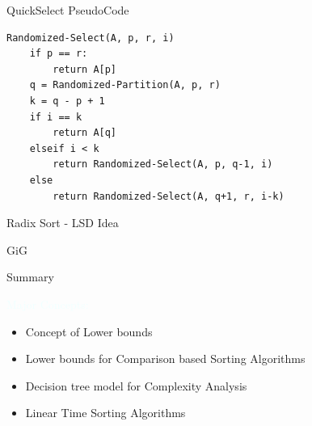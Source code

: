 \documentclass{beamer}
\newcommand{\tblue}[1]{{\Large {\textcolor{azure}{#1}}}}
\begin{document}
\begin{frame}[fragile]{QuickSelect PseudoCode}
\begin{verbatim}
Randomized-Select(A, p, r, i)
    if p == r:
        return A[p]
    q = Randomized-Partition(A, p, r)
    k = q - p + 1
    if i == k
        return A[q]
    elseif i < k
        return Randomized-Select(A, p, q-1, i)
    else
        return Randomized-Select(A, q+1, r, i-k)
\end{verbatim}
\end{frame}


\begin{frame}{Radix Sort - LSD Idea}
\begin{center}
GiG
\end{center}
\end{frame}


\begin{frame}{Summary}

\tblue{Major Concepts:}
\begin{itemize}
\item Concept of Lower bounds
\item Lower bounds for Comparison based Sorting Algorithms
\item Decision tree model for Complexity Analysis
\item Linear Time Sorting Algorithms
\end{itemize}
\end{frame}
\end{document}
